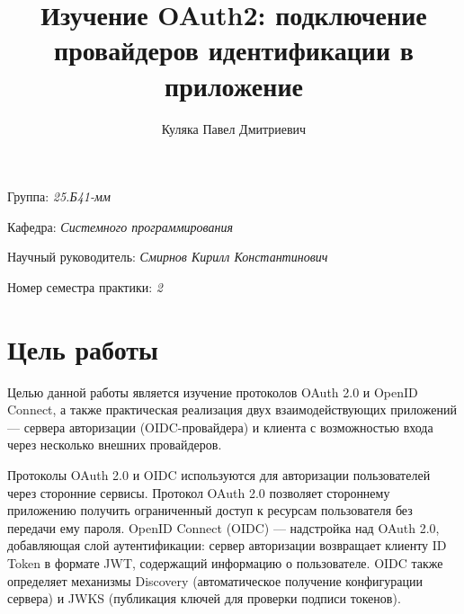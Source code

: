 \documentclass[a4paper]{article}
\title{Изучение OAuth2: подключение провайдеров идентификации в приложение}
\author{Куляка Павел Дмитриевич}
\date{}
\begin{document}
\maketitle

\begin{flushright}
    Группа: \emph{25.Б41-мм}

    Кафедра: \emph{Системного программирования}

    Научный руководитель: \emph{Смирнов Кирилл Константинович}

    Номер семестра практики: \emph{2}
\end{flushright} 


\section{Цель работы}


Целью данной работы является изучение протоколов OAuth 2.0 и OpenID Connect, а также практическая реализация двух взаимодействующих приложений --- сервера авторизации (OIDC-провайдера) и клиента с возможностью входа через несколько внешних провайдеров.


Протоколы OAuth 2.0 и OIDC используются для авторизации пользователей через сторонние сервисы. Протокол OAuth 2.0 позволяет стороннему приложению получить ограниченный доступ к ресурсам пользователя без передачи ему пароля. OpenID Connect (OIDC) --- надстройка над OAuth 2.0, добавляющая слой аутентификации: сервер авторизации возвращает клиенту ID Token в формате JWT, содержащий информацию о пользователе. OIDC также определяет механизмы Discovery (автоматическое получение конфигурации сервера) и JWKS (публикация ключей для проверки подписи токенов). 
\end{document}
